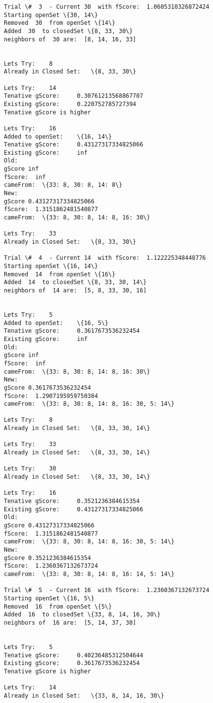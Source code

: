 \documentclass[11pt]{article}
\begin{document}
\begin{Verbatim}[commandchars=\\\{\}]
Trial \#  3  - Current 30  with fScore:  1.0605310326872424
Starting openSet \{30, 14\}
Removed  30  from openSet \{14\}
Added  30  to closedSet \{8, 33, 30\}
neighbors of  30 are:  [8, 14, 16, 33] 


Lets Try:	 8
Already in Closed Set:	 \{8, 33, 30\}

Lets Try:	 14
Tenative gScore:	 0.30761213568867707
Existing gScore:	 0.220752785727394
Tenative gScore is higher

Lets Try:	 16
Added to openSet:	 \{16, 14\}
Tenative gScore:	 0.43127317334825066
Existing gScore:	 inf
Old:
gScore inf
fScore:  inf
cameFrom:  \{33: 8, 30: 8, 14: 8\}
New:
gScore 0.43127317334825066
fScore:  1.3151862481540877
cameFrom:  \{33: 8, 30: 8, 14: 8, 16: 30\}

Lets Try:	 33
Already in Closed Set:	 \{8, 33, 30\}

Trial \#  4  - Current 14  with fScore:  1.122225348448776
Starting openSet \{16, 14\}
Removed  14  from openSet \{16\}
Added  14  to closedSet \{8, 33, 30, 14\}
neighbors of  14 are:  [5, 8, 33, 30, 16] 


Lets Try:	 5
Added to openSet:	 \{16, 5\}
Tenative gScore:	 0.3617673536232454
Existing gScore:	 inf
Old:
gScore inf
fScore:  inf
cameFrom:  \{33: 8, 30: 8, 14: 8, 16: 30\}
New:
gScore 0.3617673536232454
fScore:  1.2907195959750384
cameFrom:  \{33: 8, 30: 8, 14: 8, 16: 30, 5: 14\}

Lets Try:	 8
Already in Closed Set:	 \{8, 33, 30, 14\}

Lets Try:	 33
Already in Closed Set:	 \{8, 33, 30, 14\}

Lets Try:	 30
Already in Closed Set:	 \{8, 33, 30, 14\}

Lets Try:	 16
Tenative gScore:	 0.3521236384615354
Existing gScore:	 0.43127317334825066
Old:
gScore 0.43127317334825066
fScore:  1.3151862481540877
cameFrom:  \{33: 8, 30: 8, 14: 8, 16: 30, 5: 14\}
New:
gScore 0.3521236384615354
fScore:  1.2360367132673724
cameFrom:  \{33: 8, 30: 8, 14: 8, 16: 14, 5: 14\}

Trial \#  5  - Current 16  with fScore:  1.2360367132673724
Starting openSet \{16, 5\}
Removed  16  from openSet \{5\}
Added  16  to closedSet \{33, 8, 14, 16, 30\}
neighbors of  16 are:  [5, 14, 37, 30] 


Lets Try:	 5
Tenative gScore:	 0.40236485312504644
Existing gScore:	 0.3617673536232454
Tenative gScore is higher

Lets Try:	 14
Already in Closed Set:	 \{33, 8, 14, 16, 30\}


\end{Verbatim}
\end{document}

